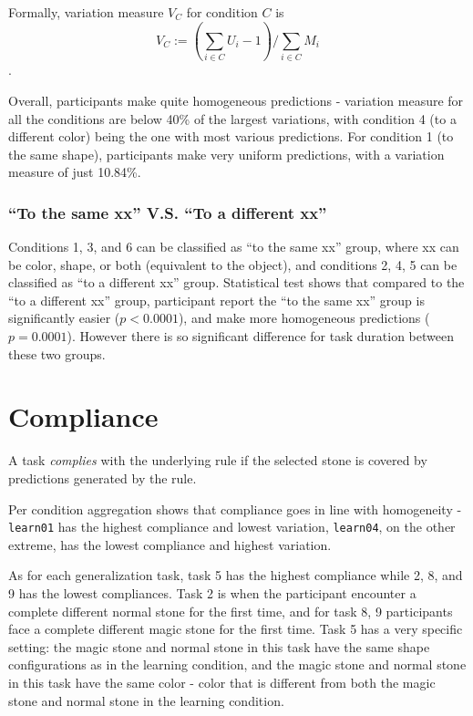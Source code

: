 \documentclass{article}
\begin{document}
Formally, variation measure $V_C$ for condition $C$ is $$V_C := (\sum_{i \in C}U_i-1)/\sum_{i \in C}M_i$$.

Overall, participants make quite homogeneous predictions - variation measure for all the conditions are below 40\% of the largest variations, with condition 4 (to a different color) being the one with most various predictions. For condition 1 (to the same shape), participants make very uniform predictions, with a variation measure of just 10.84\%.

\subsubsection*{``To the same xx'' V.S. ``To a different xx''}

Conditions 1, 3, and 6 can be classified as ``to the same xx'' group, where xx can be color, shape, or both (equivalent to the object), and conditions 2, 4, 5 can be classified as ``to a different xx'' group. Statistical test shows that compared to the ``to a different xx'' group, participant report the ``to the same xx'' group is significantly easier ($p<0.0001$), and make more homogeneous predictions ($p=0.0001$). However there is so significant difference for task duration between these two groups.

\section{Compliance}

A task \emph{complies} with the underlying rule if the selected stone is covered by predictions generated by the rule. 

Per condition aggregation shows that compliance goes in line with homogeneity - \texttt{learn01} has the highest compliance and lowest variation, \texttt{learn04}, on the other extreme, has the lowest compliance and highest variation.

As for each generalization task, task 5 has the highest compliance while 2, 8, and 9 has the lowest compliances. Task 2 is when the participant encounter a complete different normal stone for the first time, and for task 8, 9 participants face a complete different magic stone for the first time. Task 5 has a very specific setting: the magic stone and normal stone in this task have the same shape configurations as in the learning condition, and the magic stone and normal stone in this task have the same color - color that is different from both the magic stone and normal stone in the learning condition.
\end{document}
